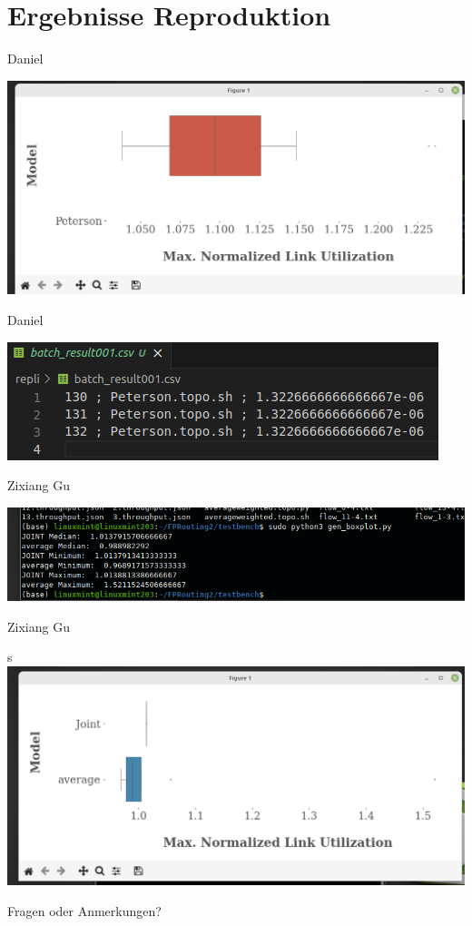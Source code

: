 \documentclass[aspectratio=169,10pt]{beamer}
\begin{document}
\section{Ergebnisse Reproduktion}
\begin{frame}{Daniel}
\begin{center}
\includegraphics[width=\textwidth]{images/repr_daniel_10.png}
\end{center}
\end{frame}
\begin{frame}{Daniel}
\begin{center}
\includegraphics[width=\textwidth]{images/repr_daniel1.png}
\end{center}
\end{frame}
\begin{frame}{Zixiang Gu}
\begin{center}
\includegraphics[width=\textwidth]{images/repr_zixiang1.png}
\end{center}
\end{frame}
\begin{frame}{Zixiang Gu}
\begin{center}s
\includegraphics[width=\textwidth]{images/repr_zixiang_10.png}
\end{center}
\end{frame}

\begin{frame}[t,standout]
\Large
Fragen oder Anmerkungen?
\end{frame}
\end{document}
